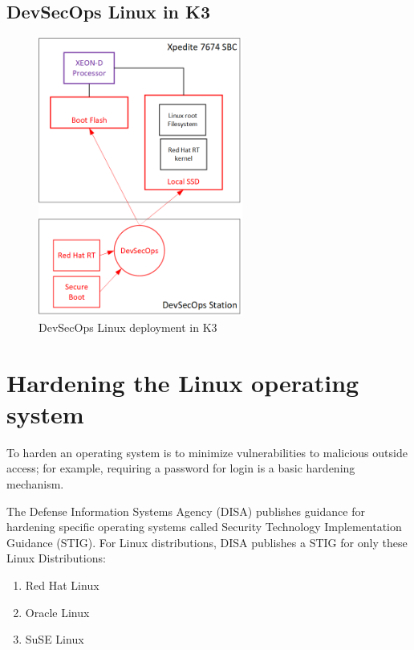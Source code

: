 \documentclass[12pt]{article}
\begin{document}
%
\subsection{DevSecOps Linux in K3}


\begin{figure}[H]
    \begin{center}
    \includegraphics[width=0.6\textwidth]{img/dev_sec_ops}
    \caption{DevSecOps Linux deployment in K3}
    \label{fig:dev_sec_ops}
    \end{center}
\end{figure}




%
\newpage
\section{Hardening the Linux operating system}
\label{sec:image_hardening}

To harden an operating system is to minimize vulnerabilities to malicious
outside access; for example, requiring a password for login is a basic hardening
mechanism.

The Defense Information Systems Agency (DISA) publishes guidance for hardening
specific operating systems called Security Technology Implementation Guidance
(STIG).  For Linux distributions, DISA publishes a STIG for only these Linux
Distributions:
\begin{enumerate}
    \item Red Hat Linux
    \item Oracle Linux
    \item SuSE Linux
\end{enumerate}
\end{document}
